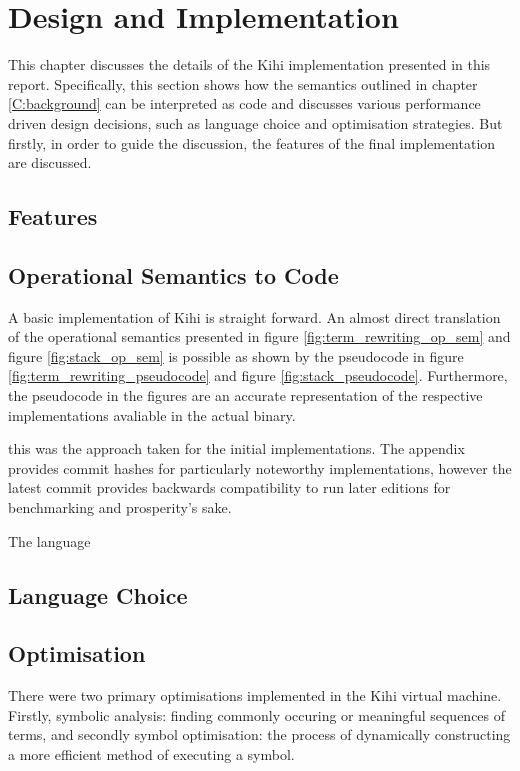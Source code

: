 \chapter{Design and Implementation} \label{C:implementation} 
This chapter discusses the details of the Kihi implementation presented in this report. Specifically, this section shows how the semantics outlined in chapter \ref{C:background} can be interpreted as code and discusses various performance driven design decisions, such as language choice and optimisation strategies. But firstly, in order to guide the discussion, the features of the final implementation are discussed.

\section{Features}

\section{Operational Semantics to Code}
A basic implementation of Kihi is straight forward. An almost direct translation of the operational semantics presented in figure \ref{fig:term_rewriting_op_sem} and figure \ref{fig:stack_op_sem} is possible as shown by the pseudocode in figure \ref{fig:term_rewriting_pseudocode} and figure \ref{fig:stack_pseudocode}. Furthermore, the pseudocode in the figures are an accurate representation of the respective implementations avaliable in the actual binary.



this was the approach taken for the initial implementations. The appendix provides commit hashes for particularly noteworthy implementations, however the latest commit provides backwards compatibility to run later editions for benchmarking and prosperity's sake.

The language




\section{Language Choice}

\section{Optimisation}
There were two primary optimisations implemented in the Kihi virtual
machine. Firstly, symbolic analysis: finding commonly occuring or
meaningful sequences of terms, and secondly symbol optimisation: the
process of dynamically constructing a more efficient method of executing
a symbol. 

